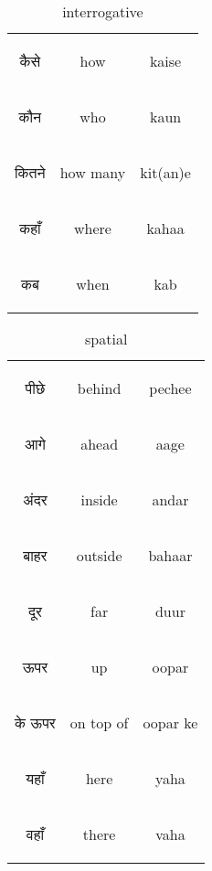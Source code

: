 \begin{table}[H]
    \centering
    \begin{tabular}{c|c|c}        
    \begin{hindi} कैसे \end{hindi} & how & kaise \\
    \begin{hindi} कौन \end{hindi} & who & kaun \\
    \begin{hindi} कितने \end{hindi} & how many & kit(an)e \\
    \begin{hindi} कहाँ \end{hindi} & where & kahaa \\
    \begin{hindi} कब \end{hindi} & when & kab \\
    \end{tabular}    
    \caption{interrogative}
    \label{tab:adverbs_interrogative}
\end{table}

\begin{table}[H]
    \centering
    \begin{tabular}{c|c|c}        
    \begin{hindi} पीछे \end{hindi} & behind & pechee \\
    \begin{hindi} आगे \end{hindi} & ahead & aage  \\
    \begin{hindi} अंदर \end{hindi} & inside & andar \\
    \begin{hindi} बाहर \end{hindi} & outside & bahaar \\
    \begin{hindi} दूर \end{hindi} & far & duur \\
    \begin{hindi} ऊपर \end{hindi} & up & oopar \\
    \begin{hindi} के ऊपर\end{hindi} & on top of & oopar ke \\
    \begin{hindi} यहाँ \end{hindi} & here & yaha \\
    \begin{hindi} वहाँ \end{hindi} & there & vaha \\
    \end{tabular}    
    \caption{spatial}
    \label{tab:adverbs_spatial}
\end{table}




